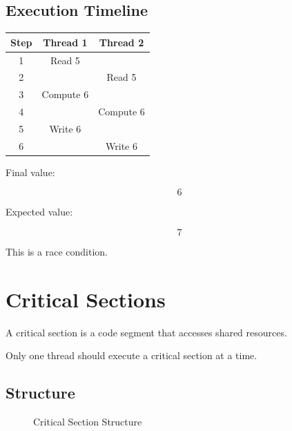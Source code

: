 \subsection{Execution Timeline}

\begin{longtable}{|c|c|c|}
\hline
Step & Thread 1 & Thread 2 \\
\hline
1 & Read 5 & \\
\hline
2 & & Read 5 \\
\hline
3 & Compute 6 & \\
\hline
4 & & Compute 6 \\
\hline
5 & Write 6 & \\
\hline
6 & & Write 6 \\
\hline
\end{longtable}

Final value:

\[
6
\]

Expected value:

\[
7
\]

This is a race condition.

\section{Critical Sections}

A critical section is a code segment that accesses shared resources.

Only one thread should execute a critical section at a time.

\subsection{Structure}

\begin{figure}[H]
\centering
{}
\caption{Critical Section Structure}
\end{figure}

